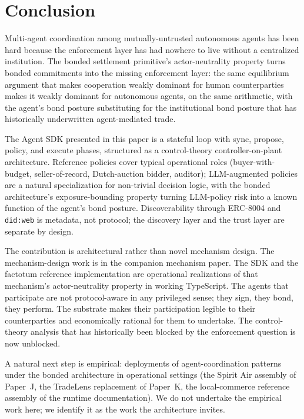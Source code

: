 \documentclass[11pt,a4paper]{article}
\theoremstyle{definition}
\theoremstyle{remark}
\begin{document}
\section{Conclusion}
\label{sec:conclusion}

Multi-agent coordination among mutually-untrusted autonomous agents
has been hard because the enforcement layer has had nowhere to live
without a centralized institution. The bonded settlement primitive's
actor-neutrality property turns bonded commitments into the missing
enforcement layer: the same equilibrium argument that makes
cooperation weakly dominant for human counterparties makes it weakly
dominant for autonomous agents, on the same arithmetic, with the
agent's bond posture substituting for the institutional bond posture
that has historically underwritten agent-mediated trade.

The Agent SDK presented in this paper is a stateful loop with sync,
propose, policy, and execute phases, structured as a control-theory
controller-on-plant architecture. Reference policies cover typical
operational roles (buyer-with-budget, seller-of-record, Dutch-auction
bidder, auditor); LLM-augmented policies are a natural specialization
for non-trivial decision logic, with the bonded architecture's
exposure-bounding property turning LLM-policy risk into a known
function of the agent's bond posture. Discoverability through
ERC-8004 and \texttt{did:web} is metadata, not protocol; the
discovery layer and the trust layer are separate by design.

The contribution is architectural rather than novel mechanism design.
The mechanism-design work is in the companion mechanism paper. The
SDK and the factotum reference implementation are operational
realizations of that mechanism's actor-neutrality property in working
TypeScript. The agents that participate are not protocol-aware in
any privileged sense; they sign, they bond, they perform. The
substrate makes their participation legible to their counterparties
and economically rational for them to undertake. The control-theory
analysis that has historically been blocked by the enforcement
question is now unblocked.

A natural next step is empirical: deployments of agent-coordination
patterns under the bonded architecture in operational settings (the
Spirit Air assembly of Paper~J, the TradeLens replacement of
Paper~K, the local-commerce reference assembly of the runtime
documentation). We do not undertake the empirical work here; we
identify it as the work the architecture invites.
\end{document}
